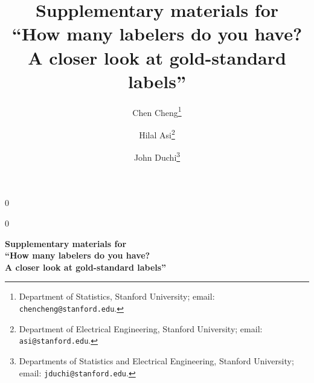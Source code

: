 \documentclass[12pt]{article}
\newcommand{\blind}{0}
\numberwithin{theorem}{section}
\numberwithin{figure}{section}
\begin{document}
%

\def\spacingset#1{\renewcommand{\baselinestretch}%
{#1}\small\normalsize} \spacingset{1}



\blind
{
  \title{\bf Supplementary materials for \\ ``How many labelers do you have? \\
  	A closer look at gold-standard labels''}
  \author{Chen Cheng\thanks{Department of Statistics, Stanford University; email: \texttt{chencheng@stanford.edu}.} \and
  	Hilal Asi\thanks{Department of Electrical Engineering, Stanford University; email: \texttt{asi@stanford.edu}.}
  	\and
  	John Duchi\thanks{Departments of Statistics and Electrical Engineering, Stanford University; email: \texttt{jduchi@stanford.edu}.}}
  \maketitle
} \fi

\blind
{
  \bigskip
  \bigskip
  \bigskip
  \begin{center}
    {\LARGE\bf Supplementary materials for \\ ``How many labelers do you have? \\
    	A closer look at gold-standard labels''}
\end{center}
  \medskip
} \fi


\newpage
\spacingset{1.87} %

\appendix
\setcounter{proposition}{7}

\newcommand{\mt}{$\textsc{M}_\beta$}
\newcommand{\Hessian}{H_L}  %
\newcommand{\hessfunc}{\mathsf{he}}  %
\newcommand{\linkerr}{\mathsf{le}}  %
\newcommand{\varfunc}{C_m}  %
\newcommand{\fisher}{\mathsf{I}}
\newcommand{\fishermv}{\fisher\mv}
\providecommand{\lipconst}{\mathsf{L}}
\newcommand{\uinit}{u_n^{\textup{init}}}
\newcommand{\uerror}{\epsilon}



\end{document}
